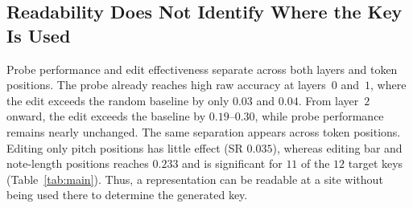 \documentclass{article}
\begin{document}
\subsection{Readability Does Not Identify Where the Key Is Used}
\label{sec:h5}
Probe performance and edit effectiveness separate across both layers and token positions.
The probe already reaches high raw accuracy at layers~$0$ and~$1$, where the edit exceeds the random baseline by only $0.03$ and $0.04$.
From layer~$2$ onward, the edit exceeds the baseline by $0.19$--$0.30$, while probe performance remains nearly unchanged.
The same separation appears across token positions.
Editing only pitch positions has little effect (SR $0.035$), whereas editing bar and note-length positions reaches $0.233$ and is significant for $11$ of the $12$ target keys (Table~\ref{tab:main}).
Thus, a representation can be readable at a site without being used there to determine the generated key.
\end{document}
